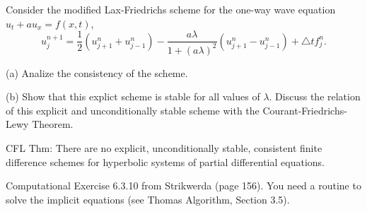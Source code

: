 \documentclass[12pt]{article}
\begin{document}
\medbreak

\noindent{\bf [4]} Consider the modified Lax-Friedrichs scheme for the one-way wave equation $u_t+au_x=f(x,t)$,
$$u^{n+1}_j=\frac{1}{2}(u^n_{j+1}+u^n_{j-1})-\frac{a\lambda}{1+(a\lambda)^2}(u^n_{j+1}-u^n_{j-1})+\triangle tf^n_j.$$

(a) Analize the consistency of the scheme. 

(b) Show that this explict scheme is stable for all values of $\lambda$. Discuss the relation of this explicit and unconditionally stable scheme with the Courant-Friedrichs-Lewy Theorem. 

CFL Thm: There are no explicit, unconditionally stable, consistent finite difference schemes for hyperbolic systems of partial differential equations. 

\medbreak 

\noindent{\bf [5]} Computational Exercise 6.3.10 from Strikwerda (page 156). You need a routine to solve the implicit equations (see Thomas Algorithm, Section 3.5). 


\end{document}
